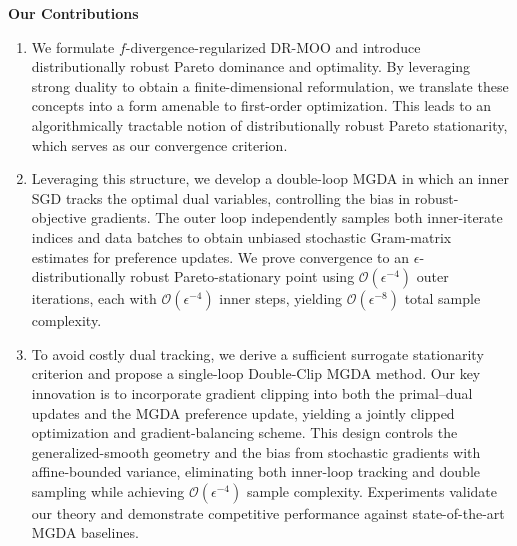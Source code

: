 \documentclass[twoside]{article} %
\theoremstyle{plain}
\theoremstyle{definition}
\theoremstyle{remark}
\begin{document}
\textbf{Our Contributions}
\begin{enumerate}[leftmargin = *, topsep = 0pt]
    \item We formulate $f$-divergence-regularized DR-MOO and introduce distributionally robust Pareto dominance and optimality. By leveraging strong duality to obtain a finite-dimensional reformulation, we translate these concepts into a form amenable to first-order optimization. This leads to an algorithmically tractable notion of distributionally robust Pareto stationarity, which serves as our convergence criterion.
    
    \item Leveraging this structure, we develop a double-loop MGDA in which an inner SGD tracks the optimal dual variables, controlling the bias in robust-objective gradients. The outer loop independently samples both inner-iterate indices and data batches to obtain unbiased stochastic Gram-matrix estimates for preference updates. We prove convergence to an \(\epsilon\)-distributionally robust Pareto-stationary point using \(\mathcal{O}(\epsilon^{-4})\) outer iterations, each with \(\mathcal{O}(\epsilon^{-4})\) inner steps, yielding \(\mathcal{O}(\epsilon^{-8})\) total sample complexity.
    
    \item To avoid costly dual tracking, we derive a sufficient surrogate stationarity criterion and propose a single-loop Double-Clip MGDA method. Our key innovation is to incorporate gradient clipping into both the primal--dual updates and the MGDA preference update, yielding a jointly clipped optimization and gradient-balancing scheme. This design controls the generalized-smooth geometry and the bias from stochastic gradients with affine-bounded variance, eliminating both inner-loop tracking and double sampling while achieving \(\mathcal{O}(\epsilon^{-4})\) sample complexity. Experiments validate our theory and demonstrate competitive performance against state-of-the-art MGDA baselines.

\end{enumerate}


\end{document}
